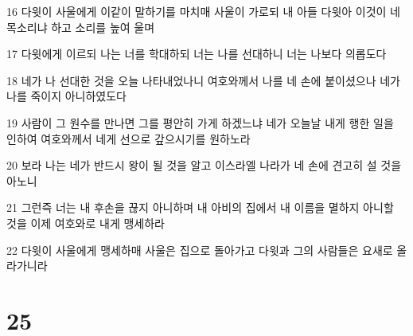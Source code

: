\par 16 다윗이 사울에게 이같이 말하기를 마치매 사울이 가로되 내 아들 다윗아 이것이 네 목소리냐 하고 소리를 높여 울며
\par 17 다윗에게 이르되 나는 너를 학대하되 너는 나를 선대하니 너는 나보다 의롭도다
\par 18 네가 나 선대한 것을 오늘 나타내었나니 여호와께서 나를 네 손에 붙이셨으나 네가 나를 죽이지 아니하였도다
\par 19 사람이 그 원수를 만나면 그를 평안히 가게 하겠느냐 네가 오늘날 내게 행한 일을 인하여 여호와께서 네게 선으로 갚으시기를 원하노라
\par 20 보라 나는 네가 반드시 왕이 될 것을 알고 이스라엘 나라가 네 손에 견고히 설 것을 아노니
\par 21 그런즉 너는 내 후손을 끊지 아니하며 내 아비의 집에서 내 이름을 멸하지 아니할 것을 이제 여호와로 내게 맹세하라
\par 22 다윗이 사울에게 맹세하매 사울은 집으로 돌아가고 다윗과 그의 사람들은 요새로 올라가니라

\chapter{25}

